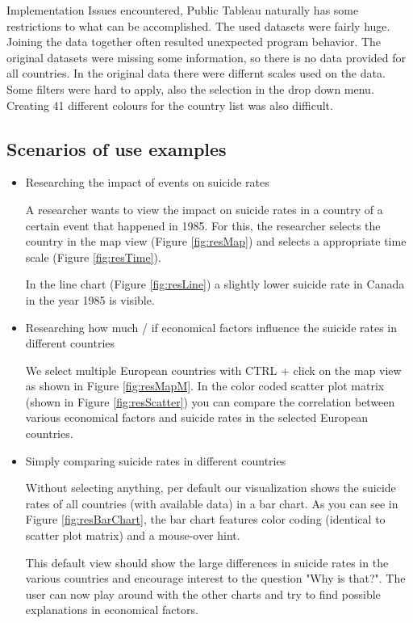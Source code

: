 \documentclass{vgtc}                          %
\begin{document}
Implementation Issues encountered, Public Tableau naturally has some restrictions to what can be accomplished.
The used datasets were fairly huge. Joining the data together often resulted unexpected program behavior. The original datasets were missing some information, so there is no data provided for all countries. In the original data there were differnt scales used on the data. Some filters were hard to apply, also the selection in the drop down menu.
Creating 41 different colours for the country list was also difficult.

\subsection{Scenarios of use examples}
\begin{itemize}
\item Researching the impact of events on suicide rates

A researcher wants to view the impact on suicide rates in a country of a certain event that happened in 1985. For this, the researcher selects the country in the map view (Figure \ref{fig:resMap}) and selects a appropriate time scale (Figure \ref{fig:resTime}).

In the line chart (Figure \ref{fig:resLine}) a slightly lower suicide rate in Canada in the year 1985 is visible.

\item Researching how much / if economical factors influence the suicide rates in different countries

We select multiple European countries with CTRL + click on the map view as shown in Figure \ref{fig:resMapM}. In the color coded scatter plot matrix (shown in Figure \ref{fig:resScatter}) you can compare the correlation between various economical factors and suicide rates in the selected European countries.

\item Simply comparing suicide rates in different countries

Without selecting anything, per default our visualization shows the suicide rates of all countries (with available data) in a bar chart. As you can see in Figure \ref{fig:resBarChart}, the bar chart features color coding (identical to scatter plot matrix) and a mouse-over hint.

This default view should show the large differences in suicide rates in the various countries and encourage interest to the question "Why is that?". The user can now play around with the other charts and try to find possible explanations in economical factors.


\end{itemize}
\end{document}
